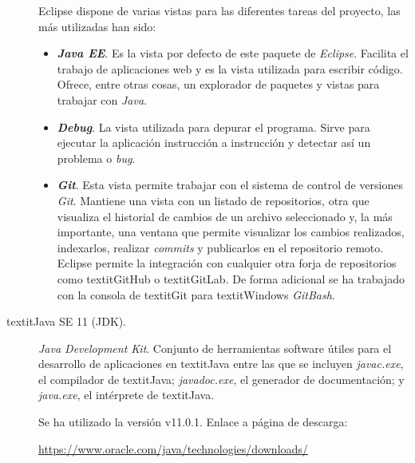 \begin{description}
		Eclipse dispone de varias vistas para las diferentes tareas del proyecto, las más utilizadas han sido:
		\begin{itemize}
			\item \textbf{\textit{Java EE}}. Es la vista por defecto de este paquete de \textit{Eclipse}. Facilita el trabajo de aplicaciones web y es la vista utilizada para escribir código. Ofrece, entre otras cosas, un explorador de paquetes y vistas para trabajar con \textit{Java}.
			\item \textbf{\textit{Debug}}. La vista utilizada para depurar el programa. Sirve para ejecutar la aplicación instrucción a instrucción y detectar así un problema o \textit{bug}.
			\item \textbf{\textit{Git}}. Esta vista permite trabajar con el sistema de control de versiones \textit{Git}. Mantiene una vista con un listado de repositorios, otra que visualiza el historial de cambios de un archivo seleccionado y, la más importante, una ventana que permite visualizar los cambios realizados, indexarlos, realizar \textit{commits} y publicarlos en el repositorio remoto. Eclipse permite la integración con cualquier otra forja de repositorios como textit{GitHub} o textit{GitLab}.
			De forma adicional se ha trabajado con la consola de textit{Git} para textit{Windows} \textit{GitBash}.
		\end{itemize}
		
	\item[textit{Java SE 11 (JDK)}.] \textit{Java Development Kit}. Conjunto de herramientas software útiles para el desarrollo de aplicaciones en textit{Java} entre las que se incluyen \textit{javac.exe}, el compilador de textit{Java}; \textit{javadoc.exe}, el generador de documentación; y \textit{java.exe}, el intérprete de textit{Java}.
	
		Se ha utilizado la versión  v11.0.1. Enlace a página de descarga:
		
		\url{https://www.oracle.com/java/technologies/downloads/}
	

\end{description}
